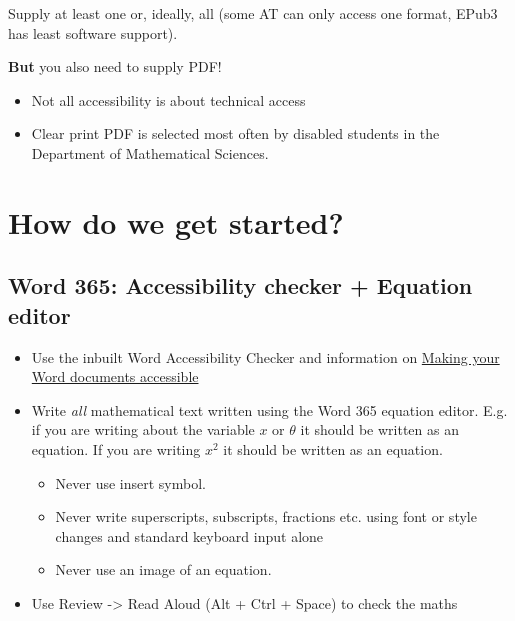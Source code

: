 \documentclass[
  12pt,
  a4paper]{extarticle}
\providecommand{\tightlist}{%
  \setlength{\itemsep}{0pt}\setlength{\parskip}{0pt}}
\renewcommand{\;}{\,}
\begin{document}
Supply at least one or, ideally, all (some AT can only access one format, EPub3 has least software support).

\textbf{But} you also need to supply PDF!

\begin{itemize}
\tightlist
\item
  Not all accessibility is about technical access
\item
  Clear print PDF is selected most often by disabled students in the Department of Mathematical Sciences.
\end{itemize}

\hypertarget{how-do-we-get-started}{%
\section{How do we get started?}\label{how-do-we-get-started}}

\hypertarget{word-365-accessibility-checker-equation-editor}{%
\subsection{Word 365: Accessibility checker + Equation editor}\label{word-365-accessibility-checker-equation-editor}}

\begin{itemize}
\tightlist
\item
  Use the inbuilt Word Accessibility Checker and information on \href{https://support.office.com/en-gb/article/make-your-word-documents-accessible-to-people-with-disabilities-d9bf3683-87ac-47ea-b91a-78dcacb3c66d}{Making your Word documents accessible}
\item
  Write \emph{all} mathematical text written using the Word 365 equation editor. E.g. if you are writing about the variable \(x\) or \(\theta\) it should be written as an equation. If you are writing \(x^2\) it should be written as an equation.

  \begin{itemize}
  \tightlist
  \item
    Never use insert symbol.
  \item
    Never write superscripts, subscripts, fractions etc. using font or style changes and standard keyboard input alone
  \item
    Never use an image of an equation.
  \end{itemize}
\item
  Use Review -\textgreater{} Read Aloud (Alt + Ctrl + Space) to check the maths
\end{itemize}
\end{document}
